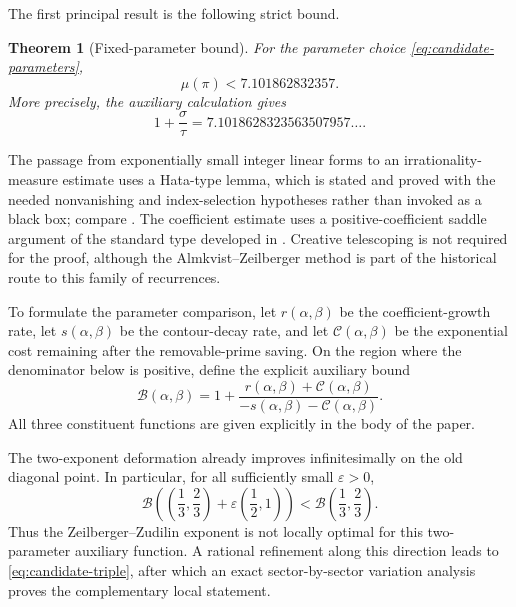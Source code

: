 \documentclass[11pt,reqno,letterpaper]{amsart}
\numberwithin{equation}{section}
\newtheorem{theorem}{Theorem}[section]
\theoremstyle{definition}
\theoremstyle{remark}
\begin{document}
The first principal result is the following strict bound.

\begin{theorem}[Fixed-parameter bound]\label{thm:main-bound}
For the parameter choice \eqref{eq:candidate-parameters},
\[
  \mu(\pi)<7.101862832357.
\]
More precisely, the auxiliary calculation gives
\[
  1+\frac{\sigma}{\tau}
  =7.1018628323563507957\ldots .
\]
\end{theorem}

The passage from exponentially small integer linear forms to an
irrationality-measure estimate uses a Hata-type lemma, which is stated and
proved with the needed nonvanishing and index-selection hypotheses rather
than invoked as a black box; compare \cite{hata-1993}.  The coefficient
estimate uses a positive-coefficient saddle argument of the standard type
developed in \cite[Chapter~VIII]{flajolet-sedgewick-2009}.  Creative
telescoping is not required for the proof, although the
Almkvist--Zeilberger method \cite{almkvist-zeilberger-1990} is part of the
historical route to this family of recurrences.

To formulate the parameter comparison, let $r(\alpha,\beta)$ be the
coefficient-growth rate, let $s(\alpha,\beta)$ be the contour-decay rate,
and let $\mathcal C(\alpha,\beta)$ be the exponential cost remaining after
the removable-prime saving.  On the region where the denominator below is
positive, define the explicit auxiliary bound
\begin{equation}\label{eq:auxiliary-bound}
 \mathcal B(\alpha,\beta)
 =1+\frac{r(\alpha,\beta)+\mathcal C(\alpha,\beta)}
 {-s(\alpha,\beta)-\mathcal C(\alpha,\beta)}.
\end{equation}
All three constituent functions are given explicitly in the body of the
paper.

The two-exponent deformation already improves infinitesimally on the old
diagonal point.  In particular, for all sufficiently small
$\varepsilon>0$,
\begin{equation}\label{eq:old-point-variation}
 \mathcal B\left(
   \left(\frac13,\frac23\right)
   +\varepsilon\left(\frac12,1\right)
 \right)
 <
 \mathcal B\left(\frac13,\frac23\right).
\end{equation}
Thus the Zeilberger--Zudilin exponent is not locally optimal for this
two-parameter auxiliary function.  A rational refinement along this
direction leads to \eqref{eq:candidate-triple}, after which an exact
sector-by-sector variation analysis proves the complementary local
statement.
\end{document}

